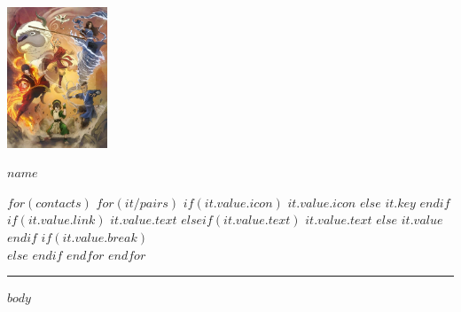 \documentclass[10pt]{article}
\begin{document}
\begin{minipage}{0.2\textwidth}
  \includegraphics[width=3cm]{avatar.jpg}
\end{minipage}
\begin{minipage}{0.8\textwidth}
  {%
  \centering\huge{\textbf{\uppercase{$name$}}} \\
  \hfill
  }

  \vspace{-1em}

  \begin{center}
  $for(contacts)$
    $for(it/pairs)$
      $if(it.value.icon)$
        \fa$it.value.icon$
      $else$
        \textbf{$it.key$}
      $endif$
      \hspace{0.3em}
      $if(it.value.link)$
        \href{$it.value.link$}{$it.value.text$}
      $elseif(it.value.text)$
        {$it.value.text$}
      $else$
        {$it.value$}
      $endif$
      $if(it.value.break)$
        \\
      $else$
        \>
      $endif$
    $endfor$
  $endfor$
  \end{center}
\end{minipage}

\textcolor{lightgray}{\rule{\textwidth}{0.05pt}}

\vspace{-.5em}

$body$
\end{document}
